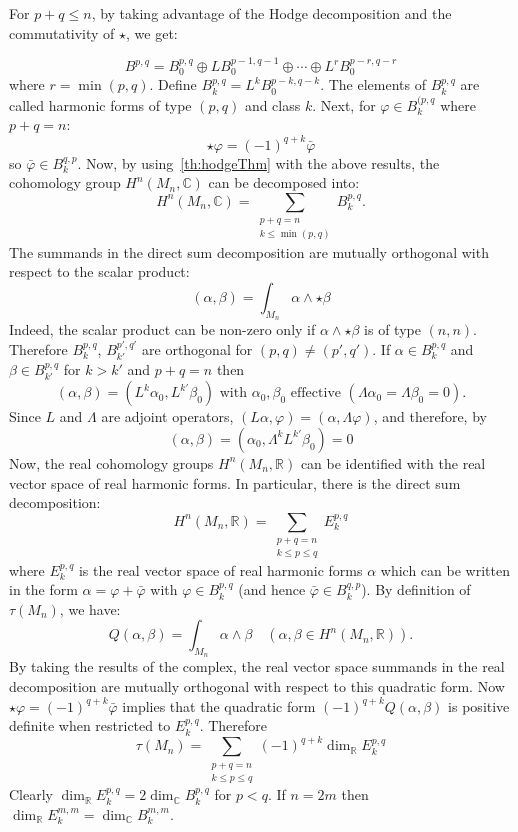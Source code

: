 \documentclass{book}
\newenvironment{Proof}[1][]
  {\begin{ProofTcb}[#1]}
  {\end{ProofTcb}}
\renewcommand{\phi}{\varphi}
\begin{document}
\begin{Proof}
  For $p+q \leq n$, by taking advantage of the Hodge decomposition and the commutativity of $\star$, we get:

  \[
    B^{p,q} = B_0^{p,q} \oplus LB_0^{p-1,q-1} \oplus \cdots \oplus L^r B_0^{p-r,q-r}
  \]
  where $r = \min(p,q)$. Define $B_k^{p,q} = L^k B_0^{p-k,q-k}$. The elements of $B_k^{p,q}$ are called
  harmonic forms of type $(p,q)$ and class $k$. Next, for $\phi \in B_k^{(p,q}$ where $p+q=n$:
  \[
    \star\phi = (-1)^{q+k}\bar{\phi}
  \]
  so $\bar{\phi}\in B_k^{q,p}$. Now,
  by using~\cref{th:hodgeThm} with the above results, the cohomology group $H^n(M_n,\mathbb{C})$ can be decomposed into:
  \[
    H^n(M_n,\mathbb{C}) = \sum_{\substack{p+q=n \\k \leq \min(p,q)}} B_k^{p,q}.
  \]
 The summands in the direct sum decomposition are mutually orthogonal with respect to the scalar product:
  \[
      (\alpha,\beta) = \int_{M_n} \alpha \wedge \star\beta
  \]
  Indeed, the scalar product can be non-zero only if $\alpha \wedge \star\beta$ is of type $(n,n)$. Therefore
  $B_k^{p,q}$, $B_{k'}^{p',q'}$ are orthogonal for $(p,q) \neq (p',q')$. If $\alpha \in B_k^{p,q}$ and $\beta
  \in B_{k'}^{p,q}$ for $k > k'$ and $p+q=n$ then
  \[
      (\alpha,\beta) = (L^k \alpha_0, L^{k'} \beta_0) \text{ with } \alpha_0, \beta_0 \text{ effective } (\Lambda \alpha_0 = \Lambda \beta_0 = 0).
  \]
  Since $L$ and $\Lambda$ are adjoint operators, $(L\alpha,\phi) = (\alpha,\Lambda\phi)$, and therefore, by
  \[
    (\alpha,\beta) = (\alpha_0,\Lambda^k L^{k'} \beta_0) = 0
  \]
  Now, the real cohomology groups $H^n(M_n,\mathbb{R})$ can be identified with the real vector space of real harmonic
  forms. In particular, there is the direct sum decomposition:
  \[
    H^n(M_n,\mathbb{R}) = \sum_{\substack{p+q=n \\ k \leq p \leq q}} E_k^{p,q}
  \]
  where $E_k^{p,q}$ is the real vector space of real harmonic forms $\alpha$ which can be written in the form
  $\alpha = \phi + \bar{\phi}$ with $\phi \in B_k^{p,q}$ (and hence $\bar{\phi} \in B_k^{q,p}$). By definition
  of
  $\tau(M_n)$, we have:
  \[
      Q(\alpha,\beta) = \int_{M_n} \alpha \wedge \beta \quad (\alpha,\beta \in H^n(M_n,\mathbb{R})).
  \]
  By taking the results of the complex, the real vector space summands in the real decomposition are mutually
  orthogonal with respect to this quadratic form. Now $\star\phi = (-1)^{q+k}\bar{\phi}$ implies that the
  quadratic form $(-1)^{q+k}Q(\alpha,\beta)$ is positive definite when restricted to $E_k^{p,q}$. Therefore
  \[
    \tau(M_n) = \sum_{\substack{p+q=n\\k\le p\le q}} (-1)^{q+k} \dim_{\mathbb{R}} E_k^{p,q}
  \]
  Clearly $\dim_{\mathbb{R}} E_k^{p,q} = 2\dim_{\mathbb{C}} B_k^{p,q}$ for $p < q$. If $n=2m$ then $\dim_{\mathbb{R}} E_k^{m,m} = \dim_{\mathbb{C}} B_k^{m,m}$.


\end{Proof}
\end{document}
